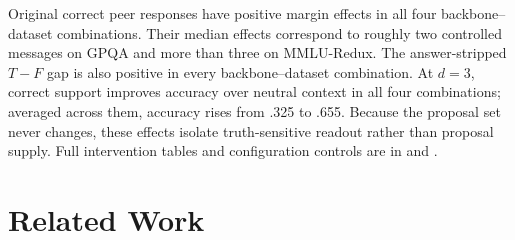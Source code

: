 \begin{table}[t]
\centering
\caption{Controlled fixed-proposal evidence for verification-aware readout.
Trace effect is the answer-margin shift from an original correct peer response
relative to neutral context; $\widehat W$ is its median equivalent controlled
support over recovery cases. $T-F$ is the gold-margin difference between
answer-stripped correct and wrong rationales. $\Delta$Acc is correct-support
accuracy minus neutral accuracy at $d=3$. All entries use the main readout
configuration; secondary configuration controls are reported in the appendix.}
\label{tab:lvd_controlled_probes}
\scriptsize
\setlength{\tabcolsep}{4pt}
\end{table}

Original correct peer responses have positive margin effects in all four
backbone--dataset combinations. Their median effects correspond to roughly two
controlled messages on GPQA and more than three on MMLU-Redux. The
answer-stripped $T-F$ gap is also positive in every backbone--dataset
combination. At $d=3$, correct support improves accuracy over neutral context
in all four combinations; averaged across them, accuracy rises from .325 to
.655. Because the proposal set never changes, these effects isolate
truth-sensitive readout rather than proposal supply. Full intervention tables
and configuration controls are in  and
.

\section{Related Work}
\label{sec:related_work}

